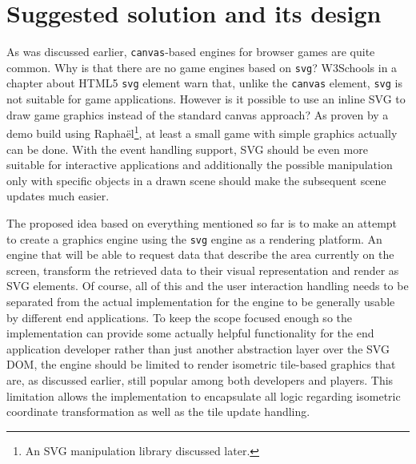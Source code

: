 \documentclass[11pt,oneside, final]{fithesis2}
\begin{document}
\chapter{Suggested solution and its design}
\label{solution}
As was discussed earlier, \texttt{canvas}-based engines for browser games are quite common. Why is that there are no game engines based on \texttt{svg}? W3Schools in a chapter about HTML5 \texttt{svg} element warn that, unlike the \texttt{canvas} element, \texttt{svg} is not suitable for game applications\cite{html5svg}. However is it possible to use an inline SVG to draw game graphics instead of the standard canvas approach? As proven by a demo build using Raphaël\footnote{An SVG manipulation library discussed later.}, at least a small game with simple graphics actually can be done\cite{raphaelfpsdemo}. With the event handling support, SVG should be even more suitable for interactive applications and additionally the possible manipulation only with specific objects in a drawn scene should make the subsequent scene updates much easier.

The proposed idea based on everything mentioned so far is to make an attempt to create a graphics engine using the \texttt{svg} engine as a rendering platform. An engine that will be able to request data that describe the area currently on the screen, transform the retrieved data to their visual representation and render as SVG elements. Of course, all of this and the user interaction handling needs to be separated from the actual implementation for the engine to be generally usable by different end applications. To keep the scope focused enough so the implementation can provide some actually helpful functionality for the end application developer rather than just another abstraction layer over the SVG DOM, the engine should be limited to render isometric tile-based graphics that are, as discussed earlier, still popular among both developers and players. This limitation allows the implementation to encapsulate all logic regarding isometric coordinate transformation as well as the tile update handling.
\end{document}
